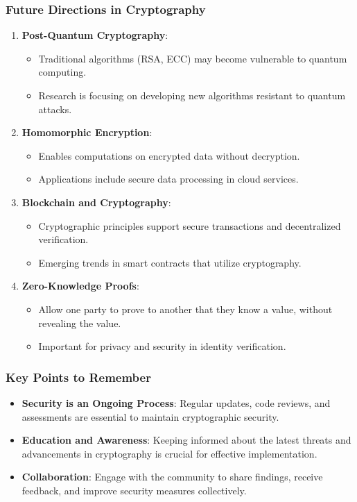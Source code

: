 \documentclass{beamer}
\begin{document}
\begin{frame}[fragile]
    \frametitle{Future Directions in Cryptography}
    \begin{enumerate}
        \item \textbf{Post-Quantum Cryptography}:
        \begin{itemize}
            \item Traditional algorithms (RSA, ECC) may become vulnerable to quantum computing.
            \item Research is focusing on developing new algorithms resistant to quantum attacks.
        \end{itemize}
        
        \item \textbf{Homomorphic Encryption}:
        \begin{itemize}
            \item Enables computations on encrypted data without decryption.
            \item Applications include secure data processing in cloud services.
        \end{itemize}

        \item \textbf{Blockchain and Cryptography}:
        \begin{itemize}
            \item Cryptographic principles support secure transactions and decentralized verification.
            \item Emerging trends in smart contracts that utilize cryptography.
        \end{itemize}

        \item \textbf{Zero-Knowledge Proofs}:
        \begin{itemize}
            \item Allow one party to prove to another that they know a value, without revealing the value.
            \item Important for privacy and security in identity verification.
        \end{itemize}
    \end{enumerate}
\end{frame}

\begin{frame}[fragile]
    \frametitle{Key Points to Remember}
    \begin{itemize}
        \item \textbf{Security is an Ongoing Process}: Regular updates, code reviews, and assessments are essential to maintain cryptographic security.
        \item \textbf{Education and Awareness}: Keeping informed about the latest threats and advancements in cryptography is crucial for effective implementation.
        \item \textbf{Collaboration}: Engage with the community to share findings, receive feedback, and improve security measures collectively.
    \end{itemize}
\end{frame}
\end{document}
